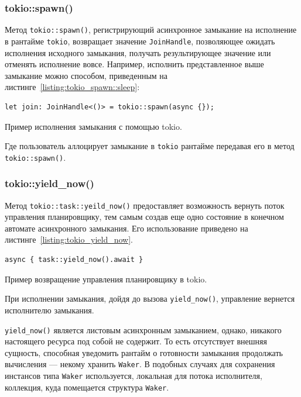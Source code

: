 \subsubsection{tokio::spawn()}

Метод \verb|tokio::spawn()|, регистрирующий асинхронное замыкание на исполнение в рантайме \verb|tokio|, возвращает значение \verb|JoinHandle|, позволяющее ожидать исполнения исходного замыкания, получать результирующее значение или отменять исполнение вовсе. Например, исполнить представленное выше замыкание можно способом, приведенным на листинге~\ref{listing:tokio_spawn::sleep}:

\begin{listing}[H]
    \begin{verbatim}
let join: JoinHandle<()> = tokio::spawn(async {});
    \end{verbatim}

    \caption{Пример исполнения замыкания с помощью tokio.}
    \label{listing:tokio_spawn::sleep}
\end{listing}

Где пользователь аллоцирует замыкание в \verb|tokio| рантайме передавая его в метод \verb|tokio::spawn()|.

\subsubsection{tokio::yield\_now()}

Метод \verb|tokio::task::yeild_now()| предоставляет возможность вернуть поток управления планировщику, тем самым создав еще одно состояние в конечном автомате асинхронного замыкания. Его использование приведено на листинге~\ref{listing:tokio_yield_now}.

\begin{listing}[H]
    \begin{verbatim}
async { task::yield_now().await }
    \end{verbatim}

    \caption{Пример возвращение управления планировщику в tokio.}
    \label{listing:tokio_yield_now}
\end{listing}

При исполнении замыкания, дойдя до вызова  \verb|yield_now()|, управление вернется исполнителю замыкания.

\verb|yield_now()| является листовым асинхронным замыканием, однако, никакого настоящего ресурса под собой не содержит. То есть отсутствует внешняя сущность, способная уведомить рантайм о готовности замыкания продолжать вычисления --- некому хранить \verb|Waker|. В подобных случаях для сохранения инстансов типа \verb|Waker| используется, локальная для потока исполнителя, коллекция, куда помещается структура \verb|Waker|.

